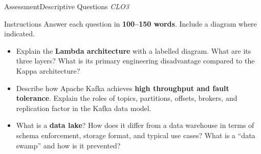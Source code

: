 \documentclass[aspectratio=169,10pt]{beamer}
\begin{document}
\begin{frame}{Assessment\textemdash Descriptive Questions \hfill\small\textit{CLO3}}
  \begin{block}{Instructions}
    Answer each question in \textbf{100--150 words}.  Include a diagram where indicated.
  \end{block}
  \vspace{8pt}
  \begin{itemize}
    \item[\textbf{D1.}] Explain the \textbf{Lambda architecture} with a labelled diagram.  What are its three layers?  What is its primary engineering disadvantage compared to the Kappa architecture?
  \end{itemize}
  \vspace{8pt}
  \begin{itemize}
    \item[\textbf{D2.}] Describe how Apache Kafka achieves \textbf{high throughput and fault tolerance}.  Explain the roles of topics, partitions, offsets, brokers, and replication factor in the Kafka data model.
  \end{itemize}
  \vspace{8pt}
  \begin{itemize}
    \item[\textbf{D3.}] What is a \textbf{data lake}?  How does it differ from a data warehouse in terms of schema enforcement, storage format, and typical use cases?  What is a ``data swamp'' and how is it prevented?
  \end{itemize}
\end{frame}
\end{document}

